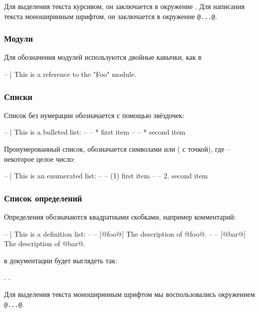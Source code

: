 Для выделения текста курсивом, он заключается в окружение
. Для написания текста моноширинным шрифтом,
он заключается в окружение \verb!@...@!.


\subsubsection{Модули}

Для обозначения модулей используются двойные кавычки, как в 

\begin{code}
-- | This is a reference to the "Foo" module.
\end{code}

\subsubsection{Списки}

Список без нумерации обозначается с помощью звёздочек:

\begin{code}
-- | This is a bulleted list:
--
--     * first item
--
--     * second item
\end{code}

Пронумерованный список, обозначается символами  или 
( с точкой),
где  -- некоторое целое число:

\begin{code}
-- | This is an enumerated list:
--
--     (1) first item
--
--     2. second item
\end{code}

\subsubsection{Список определений}

Определения обозначаются квадратными скобками,
например комментарий:

\begin{code}
-- | This is a definition list:
--
--   [@foo@] The description of @foo@.
--
--   [@bar@] The description of @bar@.
\end{code}

\noindent в документации будет выглядеть так:

.
.

\smallskip

Для выделения текста моноширинным шрифтом мы воспользовались
окружением \verb!@...@!.

